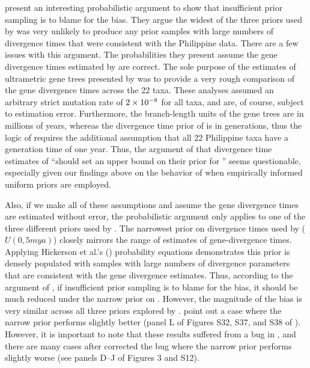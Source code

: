 \documentclass[letterpaper,12pt]{article}
\begin{document}
\begin{linenumbers}
\citet{Hickerson2013} present an interesting probabilistic argument
 to show that insufficient prior sampling is to blame for the bias.
They argue the widest of the three priors used by \citet{Oaks2012} was very
unlikely to produce any prior samples with large numbers of divergence times
that were consistent with the Philippine data.
There are a few issues with this argument.
The probabilities they present assume the gene divergence times
estimated by \citet{Oaks2012} are correct.
The sole purpose of the estimates of ultrametric gene trees presented by
\citet{Oaks2012} was to provide a very rough comparison of the gene divergence
times across the 22 taxa.
These analyses assumed an arbitrary strict mutation rate of $2\times 10^{-8}$ for all
taxa, and are, of course, subject to estimation error.
Furthermore, the branch-length units of the gene trees are in millions of
years, whereas the divergence time prior of \msb is in generations, thus the
logic of \citet{Hickerson2013} requires the additional assumption that all 22
Philippine taxa have a generation time of one year.
Thus, the argument of \citet{Hickerson2013} that divergence time estimates of
\citet{Oaks2012} ``should set an upper bound on their prior for \divt{}'' seems
questionable, especially given our findings above on the behavior of \msb when
empirically informed uniform priors are employed.

Also, if we make all of these assumptions and assume the gene divergence times
are estimated without error, the probabilistic argument only applies to one of
the three different priors used by \citet{Oaks2012}.
The narrowest prior on divergence times used by \citet{Oaks2012} ($U(0, 5
mya)$) closely mirrors the range of estimates of gene-divergence times.
Applying Hickerson et al.'s (\citeyear{Hickerson2013}) probability equations
demonstrates this prior is densely populated with samples with large numbers of
divergence parameters that are consistent with the gene divergence estimates.
Thus, according to the argument of \citet{Hickerson2013}, if insufficient prior
sampling is to blame for the bias, it should be much reduced under the narrow
prior on \divt{}.
However, the magnitude of the bias is very similar across all three priors
explored by \citet{Oaks2012}.
\citet{Hickerson2013} point out a case where the narrow prior performs
slightly better (panel L of Figures S32, S37, and S38 of \citet{Oaks2012}).
However, it is important to note that these results suffered from a bug
in \msb, and there are many cases after \citet{Oaks2012} corrected the 
bug where the narrow prior performs slightly worse (see panels D--J of
Figures 3 and S12).


\end{linenumbers}
\end{document}

